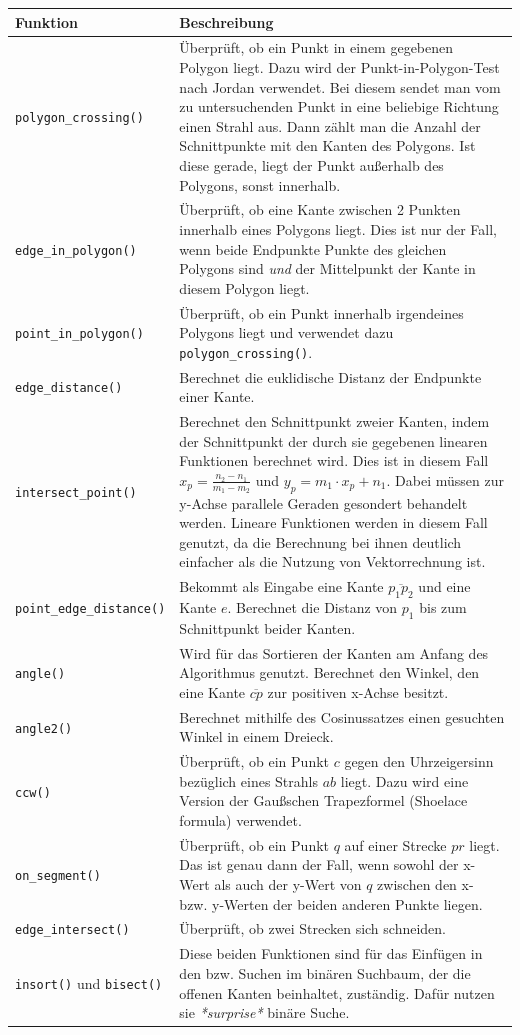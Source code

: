 \documentclass[a4paper, notitlepage, 12pt]{scrartcl}
\begin{document}
\begin{longtabu} to \linewidth {lX}
	Funktion & Beschreibung \\ \hline \hline \endhead
	\texttt{polygon\_crossing()} & Überprüft, ob ein Punkt in einem gegebenen Polygon liegt. Dazu wird der Punkt-in-Polygon-Test nach Jordan verwendet. Bei diesem sendet man vom zu untersuchenden Punkt in eine beliebige Richtung einen Strahl aus. Dann zählt man die Anzahl der Schnittpunkte mit den Kanten des Polygons. Ist diese gerade, liegt der Punkt außerhalb des Polygons, sonst innerhalb. \\ \hline
	\texttt{edge\_in\_polygon()} & Überprüft, ob eine Kante zwischen 2 Punkten innerhalb eines Polygons liegt. Dies ist nur der Fall, wenn beide Endpunkte Punkte des gleichen Polygons sind \textit{und} der Mittelpunkt der Kante in diesem Polygon liegt. \\ \hline
	\texttt{point\_in\_polygon()} & Überprüft, ob ein Punkt innerhalb irgendeines Polygons liegt und verwendet dazu \texttt{polygon\_crossing()}.\\ \hline
	\texttt{edge\_distance()} &  Berechnet die euklidische Distanz der Endpunkte einer Kante.\\ \hline
	\texttt{intersect\_point()} & Berechnet den Schnittpunkt zweier Kanten, indem der Schnittpunkt der durch sie gegebenen linearen Funktionen berechnet wird. Dies ist in diesem Fall $x_p = \frac{n_2 - n_1}{m_1 - m_2}$ und $y_p = m_1 \cdot x_p + n_1$. Dabei müssen zur y-Achse parallele Geraden gesondert behandelt werden. Lineare Funktionen werden in diesem Fall genutzt, da die Berechnung bei ihnen deutlich einfacher als die Nutzung von Vektorrechnung ist.\\ \hline
	\texttt{point\_edge\_distance()} & Bekommt als Eingabe eine Kante $\overline{p_1p_2}$ und eine Kante $e$. Berechnet die Distanz von $p_1$ bis zum Schnittpunkt beider Kanten.\\ \hline
	\texttt{angle()} & Wird für das Sortieren der Kanten am Anfang des Algorithmus genutzt. Berechnet den Winkel, den eine Kante $\overline{cp}$ zur positiven x-Achse besitzt.\\ \hline
	\texttt{angle2()} & Berechnet mithilfe des Cosinussatzes einen gesuchten Winkel in einem Dreieck.\\ \hline
	\texttt{ccw()} & Überprüft, ob ein Punkt $c$ gegen den Uhrzeigersinn bezüglich eines Strahls $ab$ liegt. Dazu wird eine Version der Gaußschen Trapezformel (Shoelace formula) verwendet.\\ \hline
	\texttt{on\_segment()} & Überprüft, ob ein Punkt $q$ auf einer Strecke $pr$ liegt. Das ist genau dann der Fall, wenn sowohl der x-Wert als auch der y-Wert von $q$ zwischen den x- bzw. y-Werten der beiden anderen Punkte liegen.\\ \hline
	\texttt{edge\_intersect()} & Überprüft, ob zwei Strecken sich schneiden. \\ \hline
	\texttt{insort()} und \texttt{bisect()} & Diese beiden Funktionen sind für das Einfügen in den bzw. Suchen im binären Suchbaum, der die offenen Kanten beinhaltet, zuständig. Dafür nutzen sie \textit{*surprise*} binäre Suche.	\\
\end{longtabu}
\end{document}

